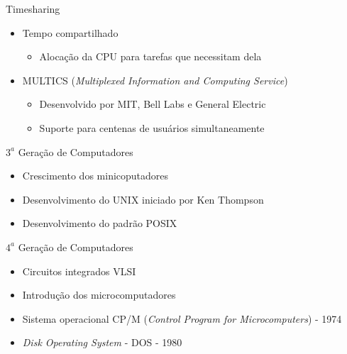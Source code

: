 \documentclass[aspectratio=169,
				xcolor=table]{beamer}
\begin{document}
	\begin{frame}{Timesharing}
		\begin{itemize}
			\item Tempo compartilhado
			\begin{itemize}
				\item Alocação da CPU para tarefas que necessitam dela
			\end{itemize}
			\vspace{1em}
			\item MULTICS (\textit{Multiplexed Information and Computing Service})
			\begin{itemize}
				\item Desenvolvido por MIT, Bell Labs e General Electric
				\item Suporte para centenas de usuários simultaneamente
			\end{itemize}
		\end{itemize}
	\end{frame}

	\begin{frame}{${3}^{a}$ Geração de Computadores}
		\begin{itemize}
			\item Crescimento dos minicoputadores
			\vspace{1em}
			\item Desenvolvimento do UNIX iniciado por Ken Thompson
			\vspace{1em}
			\item Desenvolvimento do padrão POSIX
		\end{itemize}
	\end{frame}
	
\begin{frame}{${4}^{a}$ Geração de Computadores}
		\begin{itemize}
			\item Circuitos integrados VLSI
			\vspace{1em}
			\item Introdução dos microcomputadores
			\vspace{1em}
			\item Sistema operacional CP/M (\textit{Control Program for Microcomputers}) - 1974
			\vspace{1em}
			\item \textit{Disk Operating System} - DOS - 1980
		\end{itemize}
	\end{frame}	
	
\end{document}
